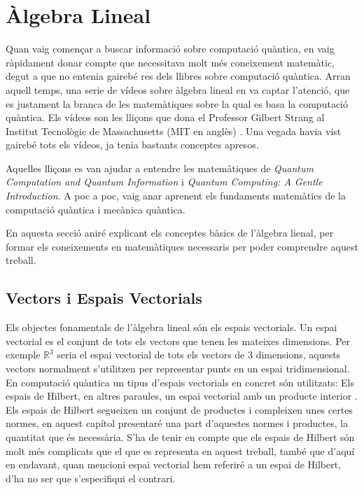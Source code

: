 \chapter{Àlgebra Lineal}\label{algebra}
Quan vaig començar a buscar informació sobre computació quàntica, en vaig ràpidament donar compte que necessitava molt més coneixement matemàtic, degut a que no entenia gairebé res dels llibres sobre computació quàntica. Arran aquell temps, una serie de vídeos sobre àlgebra lineal en va captar l’atenció, que es justament la branca de les matemàtiques sobre la qual es basa la computació quàntica. Els vídeos son les lliçons que dona el Professor Gilbert Strang al Institut Tecnològic de Massachusetts (MIT en anglès) \cite{LA_OCW_strang, LA2_OCW_strang}. Una vegada havia vist gairebé tots els vídeos, ja tenia bastants conceptes apresos. 

Aquelles lliçons es van ajudar a entendre les matemàtiques de \textit{Quantum Computation and Quantum Information} \cite{QCandQI} i \textit{Quantum Computing: A Gentle Introduction}. A poc a poc, vaig anar aprenent els fundaments matemàtics de la computació quàntica i mecànica quàntica.

En aquesta secció aniré explicant els conceptes bàsics de l'àlgebra lienal, per formar els coneixements en matemàtiques necessaris per poder comprendre aquest treball. 

\section{Vectors i Espais Vectorials}
Els objectes fonamentals de l'àlgebra lineal són els espais vectorials. Un espai vectorial es el conjunt de tots els vectors que tenen les mateixes dimensions. Per exemple  $\mathbb{R}^{3}$ seria el espai vectorial de tots els vectors de 3 dimensions, aquests vectors normalment s'utilitzen per representar punts en un espai tridimensional. En computació quàntica un tipus d'espais vectorials en concret són utilitzats: Els espais de Hilbert, en altres paraules, un espai vectorial amb un producte interior \cite{QCandQI:GramSchmidt}. Els espais de Hilbert segueixen un conjunt de productes i compleixen unes certes normes, en aquest capítol presentaré una part d'aquestes normes i productes, la quantitat que és necessària. S'ha de tenir en compte que els espais de Hilbert són molt més complicats que el que es representa en aquest treball, també que d'aquí en endavant, quan mencioni espai vectorial hem referiré a un espai de Hilbert, d'ha no ser que s'especifiqui el contrari. 

